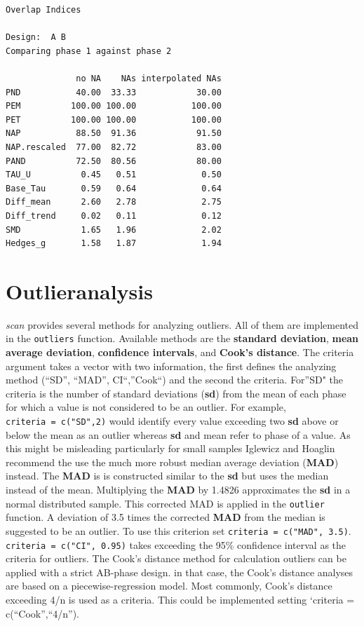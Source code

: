 \documentclass[
]{book}
\begin{document}
\begin{verbatim}
Overlap Indices

Design:  A B 
Comparing phase 1 against phase 2 

              no NA    NAs interpolated NAs
PND           40.00  33.33            30.00
PEM          100.00 100.00           100.00
PET          100.00 100.00           100.00
NAP           88.50  91.36            91.50
NAP.rescaled  77.00  82.72            83.00
PAND          72.50  80.56            80.00
TAU_U          0.45   0.51             0.50
Base_Tau       0.59   0.64             0.64
Diff_mean      2.60   2.78             2.75
Diff_trend     0.02   0.11             0.12
SMD            1.65   1.96             2.02
Hedges_g       1.58   1.87             1.94
\end{verbatim}

\hypertarget{outlieranalysis}{%
\section{Outlieranalysis}\label{outlieranalysis}}

\emph{scan} provides several methods for analyzing outliers. All of them are implemented in the \texttt{outliers} function. Available methods are the \textbf{standard deviation}, \textbf{mean average deviation}, \textbf{confidence intervals}, and \textbf{Cook's distance}. The criteria argument takes a vector with two information, the first defines the analyzing method (``SD'', ``MAD'', CI``,''Cook``) and the second the criteria. For''SD" the criteria is the number of standard deviations (\textbf{sd}) from the mean of each phase for which a value is not considered to be an outlier. For example, \texttt{criteria\ =\ c("SD",2)} would identify every value exceeding two \textbf{sd} above or below the mean as an outlier whereas \textbf{sd} and mean refer to phase of a value. As this might be misleading particularly for small samples Iglewicz and Hoaglin \citet{iglewicz_how_1993} recommend the use the much more robust median average deviation (\textbf{MAD}) instead. The \textbf{MAD} is is constructed similar to the \textbf{sd} but uses the median instead of the mean. Multiplying the \textbf{MAD} by 1.4826 approximates the \textbf{sd} in a normal distributed sample. This corrected MAD is applied in the \texttt{outlier} function. A deviation of 3.5 times the corrected \textbf{MAD} from the median is suggested to be an outlier. To use this criterion set \texttt{criteria\ =\ c("MAD",\ 3.5)}. \texttt{criteria\ =\ c("CI",\ 0.95)} takes exceeding the 95\% confidence interval as the criteria for outliers. The Cook's distance method for calculation outliers can be applied with a strict AB-phase design. in that case, the Cook's distance analyses are based on a piecewise-regression model. Most commonly, Cook's distance exceeding 4/n is used as a criteria. This could be implemented setting `criteria = c(``Cook'',``4/n'').
\end{document}

